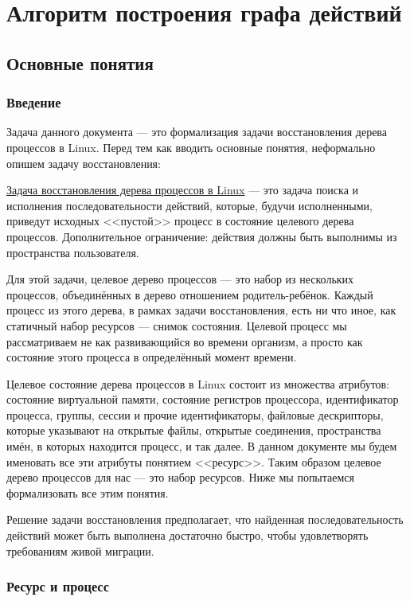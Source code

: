 \chapter{Алгоритм построения графа действий}

\section{Основные понятия}

\subsection{Введение}

Задача данного документа --- это формализация задачи восстановления дерева процессов в Linux. Перед тем как вводить основные понятия, неформально опишем задачу восстановления:

\underline{Задача восстановления дерева процессов в Linux} --- это задача поиска и исполнения последовательности действий, которые, будучи исполненными, приведут исходных <<пустой>> процесс в состояние целевого дерева процессов. Дополнительное ограничение: действия должны быть выполнимы из пространства пользователя.

Для этой задачи, целевое дерево процессов --- это набор из нескольких процессов, объединённых в дерево отношением родитель-ребёнок. Каждый процесс из этого дерева, в рамках задачи восстановления, есть ни что иное, как статичный набор ресурсов --- снимок состояния. Целевой процесс мы рассматриваем не как развивающийся во времени организм, а просто как состояние этого процесса в определённый момент времени.

Целевое состояние дерева процессов в Linux состоит из множества атрибутов: состояние виртуальной памяти, состояние регистров процессора, идентификатор процесса, группы, сессии и прочие идентификаторы, файловые дескрипторы, которые указывают на открытые файлы, открытые соединения, пространства имён, в которых находится процесс, и так далее. В данном документе мы будем именовать все эти атрибуты понятием <<ресурс>>. Таким образом целевое дерево процессов для нас --- это набор ресурсов. Ниже мы попытаемся формализовать все этим понятия.

Решение задачи восстановления предполагает, что найденная последовательность действий может быть выполнена достаточно быстро, чтобы удовлетворять требованиям живой миграции.

\subsection{Ресурс и процесс}

